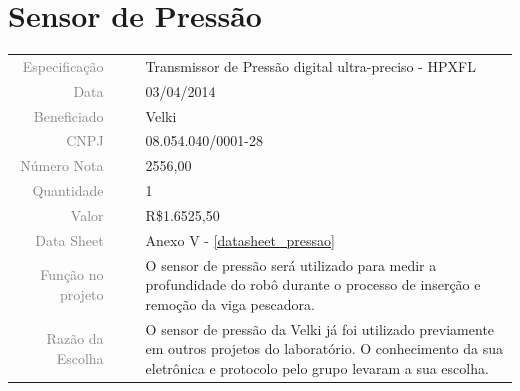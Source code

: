 

\section{Sensor de Pressão}
\label{pressao}


\begin{table}[ht!]

	\begin{tabular}{r l|l p{12cm} }
		
		\textcolor{gray}{Especificação} &&& 	{Transmissor de Pressão digital
		ultra-preciso - HPXFL}\\
		\textcolor{gray}{Data} &&& 				{03/04/2014}\\
        \textcolor{gray}{Beneficiado} &&&		{Velki} \\
        \textcolor{gray}{CNPJ} &&& 				{08.054.040/0001-28} \\
        \textcolor{gray}{Número Nota} &&& 		{2556,00} \\
		\textcolor{gray}{Quantidade} &&& 		{1} \\
		\textcolor{gray}{Valor} &&& 			{R\$1.6525,50} \\
		\textcolor{gray}{Data Sheet} &&& 		{Anexo V - \ref{datasheet_pressao} } \\

		\textcolor{gray}{Função no projeto} &&& {O sensor de pressão será utilizado
		para medir a profundidade do robô durante o processo de inserção e remoção da
		viga pescadora.} \\
		\textcolor{gray}{Razão da Escolha} &&& {O sensor de pressão da Velki já foi
		utilizado previamente em outros projetos do laboratório. O conhecimento da sua
		eletrônica e protocolo pelo grupo levaram a sua escolha.}
		

	\end{tabular}
\end{table}

\newpage

